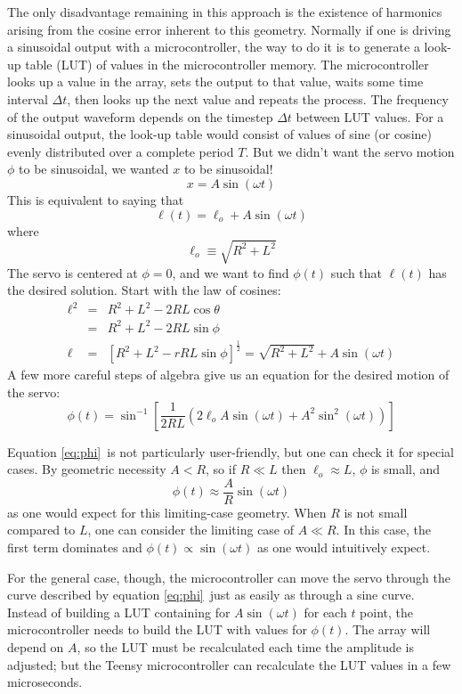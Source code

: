 \documentclass[11 pt]{article}
\begin{document}
The only disadvantage remaining in this approach is the existence of harmonics arising from the cosine error inherent to this geometry. 
Normally if one is driving a sinusoidal output with a microcontroller, the way to do it is to generate a look-up table (LUT) of values in the microcontroller memory.
The microcontroller looks up a value in the array, sets the output to that value, waits some time interval $\Delta t$, then looks up the next value and repeats the process. 
The frequency of the output waveform depends on the timestep $\Delta t$ between LUT values.
For a sinusoidal output, the look-up table would consist of values of sine (or cosine) evenly distributed over a complete period $T$.
But we didn't want the servo motion $\phi$ to be sinusoidal, we wanted $x$ to be sinusoidal!
\[ x = A \sin(\omega t) \]
This is equivalent to saying that
\[ \ell(t) = \ell_o + A \sin(\omega t) \]
where 
\[ \ell_o \equiv \sqrt{R^2+L^2} \]
The servo is centered at $\phi=0$, and we want to find $\phi(t)$ such that $\ell(t)$ has the desired solution.
Start with the law of cosines:
\begin{eqnarray*} 
	\ell^2 &=& R^2 + L^2 - 2 R L \cos\theta\\
		&=& R^2 + L^2 - 2 R L \sin\phi\\
	\ell &=& \left[ R^2+L^2 - r R L \sin\phi \right]^{\frac{1}{2}} = \sqrt{R^2+L^2} + A \sin(\omega t)
\end{eqnarray*}
A few more careful steps of algebra give us an equation for the desired motion of the servo:
\begin{equation} \label{eq:phi}
	\phi(t) = \sin^{-1} \left[\frac{1}{2RL}\left(2\ell_o A\sin(\omega t) + A^2 \sin^2(\omega t)\right)\right]
\end{equation}

Equation \ref{eq:phi}\ is not particularly user-friendly, but one can check it for special cases. 
By geometric necessity $A<R$, so if $R\ll L$ then $\ell_o \approx L$, $\phi$ is small, and 
\[ \phi(t) \approx \frac{A}{R}\sin(\omega t) \]
as one would expect for this limiting-case geometry.
When $R$ is not small compared to $L$, one can consider the limiting case of $A \ll R$. 
In this case, the first term dominates and $\phi(t) \propto \sin(\omega t)$ as one would intuitively expect. 

For the general case, though, the microcontroller can move the servo through the curve described by equation \ref{eq:phi}\ just as easily as through a sine curve. 
Instead of building a LUT containing for $A\sin(\omega t)$ for each $t$ point, the microcontroller needs to build the LUT with values for $\phi(t)$.
The array will depend on $A$, so the LUT must be recalculated each time the amplitude is adjusted; but the Teensy microcontroller can recalculate the LUT values in a few microseconds.
\end{document}
